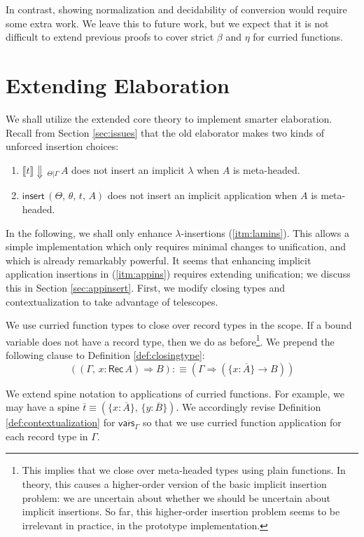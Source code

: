 \documentclass[acmsmall,review,anonymous,prologue,dvipsnames]{acmart}\settopmatter{printfolios=true,printccs=false,printacmref=false}
\newcommand{\To}{\Rightarrow}
\newcommand{\echeck}[4]{\llbracket#1\rrbracket\!\Downarrow\,_{#2|#3}\,#4}
\newcommand{\einsert}{\mathsf{insert}}
\newcommand{\Rec}{\mathsf{Rec}}
\newcommand{\ol}[1]{\overline{#1}}
\theoremstyle{remark}
\begin{document}
In contrast, showing normalization and decidability of conversion would require
some extra work. We leave this to future work, but we expect that it is not
difficult to extend previous proofs to cover strict $\beta$ and $\eta$ for
curried functions.

\section{Extending Elaboration}
\label{sec:extending_elaboration}

We shall utilize the extended core theory to implement smarter
elaboration. Recall from Section \ref{sec:issues} that the old elaborator makes
two kinds of unforced insertion choices:
\begin{enumerate}
\item\label{itm:lamins} $\echeck{t}{\Theta}{\Gamma}{A}$ does not insert an implicit $\lambda$ when $A$ is meta-headed.
\item\label{itm:appins} $\einsert\,(\Theta,\,\theta,\,t,\,A)$ does not insert an implicit application when $A$ is meta-headed.
\end{enumerate}
In the following, we shall only enhance $\lambda$-insertions
(\ref{itm:lamins}). This allows a simple implementation which only requires
minimal changes to unification, and which is already remarkably powerful. It
seems that enhancing implicit application insertions in (\ref{itm:appins})
requires extending unification; we discuss this in Section
\ref{sec:appinsert}. First, we modify closing types and contextualization to
take advantage of telescopes.

\begin{definition}
We use curried function types to close over record types in the scope. If a
bound variable does not have a record type, then we do as before\footnote{This
  implies that we close over meta-headed types using plain functions. In theory,
  this causes a higher-order version of the basic implicit insertion problem: we
  are uncertain about whether we should be uncertain about implicit
  insertions. So far, this higher-order insertion problem seems to be
  irrelevant in practice, in the prototype implementation.}. We prepend the
following clause to Definition
\ref{def:closingtype}:
\[
  ((\Gamma,\, x : \Rec\,A) \To B) :\equiv (\Gamma \To (\{x : \ol{A}\} \to B))
\]
\end{definition}
\begin{definition}[Contextualization]
We extend spine notation to applications of curried functions. For example, we
may have a spine $\ol{t} \equiv (\{x : \ol{A}\},\,\{y : \ol{B}\})$. We
accordingly revise Definition \ref{def:contextualization} for
$\overline{\mathsf{vars}_{\Gamma}}$ so that we use curried function application
for each record type in $\Gamma$.
\end{definition}
\end{document}
